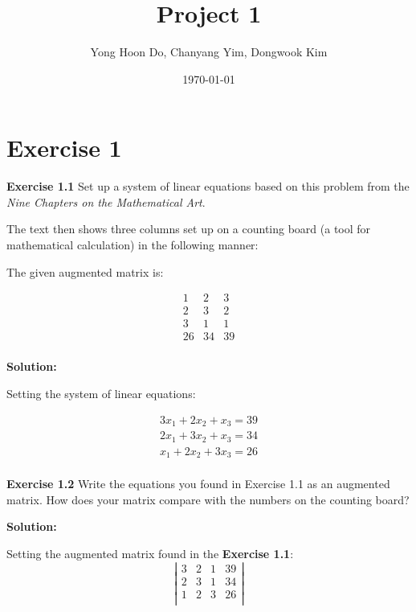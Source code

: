\documentclass[11pt]{article}
\title{Project 1}
\author{Yong Hoon Do, Chanyang Yim, Dongwook Kim}
\date{\today}
\newcommand{\sol} {
  \textbf{Solution:}
}
\begin{document}
\maketitle

\section{\bigskip\vspace{0in}\vspace{-0.1in}Exercise 1}

\noindent\textbf{Exercise 1.1} Set up a system of linear equations based on
this problem from the \textit{Nine Chapters on the Mathematical Art}.

\bigskip

The text then shows three columns set up on a counting board (a tool for
mathematical calculation) in the following manner:

\bigskip

The given augmented matrix is:

\[
  \begin{array}{cccc}
    1 & 2 & 3 \\
    2 & 3 & 2 \\
    3 & 1 & 1 \\
    26 & 34 & 39 \\
  \end{array}
\]

\sol

Setting the system of linear equations:

\begin{equation}
  \begin{array}{cccc}
    3x_1 + 2x_2 + x_3 = 39 \\
    2x_1 + 3x_2 + x_3 = 34 \\
    x_1 + 2x_2 + 3x_3 = 26 \\
  \end{array}
\end{equation}

\bigskip\noindent\textbf{Exercise 1.2} Write the equations you found in
Exercise 1.1 as an augmented matrix. How does your matrix compare with the
numbers on the counting board?

\sol

Setting the augmented matrix found in the \bigskip\noindent\textbf{Exercise 1.1}:
\[
\left|
  \begin{array}{cccc}
    3 & 2 & 1 & 39 \\
    2 & 3 & 1 & 34 \\
    1 & 2 & 3 & 26 \\
  \end{array}
\right|
\]
\end{document}
